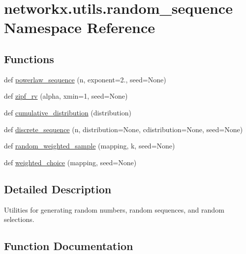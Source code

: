 \hypertarget{namespacenetworkx_1_1utils_1_1random__sequence}{}\section{networkx.\+utils.\+random\+\_\+sequence Namespace Reference}
\label{namespacenetworkx_1_1utils_1_1random__sequence}
\subsection*{Functions}
\begin{DoxyCompactItemize}
\item 
def \hyperlink{namespacenetworkx_1_1utils_1_1random__sequence_acc7ecaff954cb4c276746ad0f1a679b0}{powerlaw\+\_\+sequence} (n, exponent=2., seed=None)
\item 
def \hyperlink{namespacenetworkx_1_1utils_1_1random__sequence_a08968e4ec4cbbb119b4d22d415a4186b}{zipf\+\_\+rv} (alpha, xmin=1, seed=None)
\item 
def \hyperlink{namespacenetworkx_1_1utils_1_1random__sequence_a2f8a70b0f52671f185de7245dcb3f40f}{cumulative\+\_\+distribution} (distribution)
\item 
def \hyperlink{namespacenetworkx_1_1utils_1_1random__sequence_a5f8c7a8a6de006f5ecc0b44530949bae}{discrete\+\_\+sequence} (n, distribution=None, cdistribution=None, seed=None)
\item 
def \hyperlink{namespacenetworkx_1_1utils_1_1random__sequence_a8f3014b204ae237de04167b9a7afc8c1}{random\+\_\+weighted\+\_\+sample} (mapping, k, seed=None)
\item 
def \hyperlink{namespacenetworkx_1_1utils_1_1random__sequence_ad9f55d9570fb72f739f539f71e32e459}{weighted\+\_\+choice} (mapping, seed=None)
\end{DoxyCompactItemize}


\subsection{Detailed Description}
\begin{DoxyVerb}Utilities for generating random numbers, random sequences, and
random selections.
\end{DoxyVerb}
 

\subsection{Function Documentation}
\mbox{\label{namespacenetworkx_1_1utils_1_1random__sequence_a2f8a70b0f52671f185de7245dcb3f40f}} 
